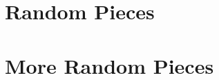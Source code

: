 \documentclass{./tex/thesis-umich}
\begin{document}
\appendix
\chapter{Random Pieces}
\chapter{More Random Pieces}




\end{document}
